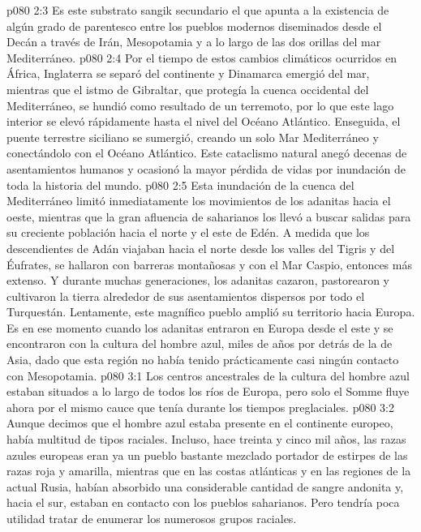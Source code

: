 \vs p080 2:3 Es este substrato sangik secundario el que apunta a la existencia de algún grado de parentesco entre los pueblos modernos diseminados desde el Decán a través de Irán, Mesopotamia y a lo largo de las dos orillas del mar Mediterráneo.
\vs p080 2:4 \pc Por el tiempo de estos cambios climáticos ocurridos en África, Inglaterra se separó del continente y Dinamarca emergió del mar, mientras que el istmo de Gibraltar, que protegía la cuenca occidental del Mediterráneo, se hundió como resultado de un terremoto, por lo que este lago interior se elevó rápidamente hasta el nivel del Océano Atlántico. Enseguida, el puente terrestre siciliano se sumergió, creando un solo Mar Mediterráneo y conectándolo con el Océano Atlántico. Este cataclismo natural anegó decenas de asentamientos humanos y ocasionó la mayor pérdida de vidas por inundación de toda la historia del mundo.
\vs p080 2:5 Esta inundación de la cuenca del Mediterráneo limitó inmediatamente los movimientos de los adanitas hacia el oeste, mientras que la gran afluencia de saharianos los llevó a buscar salidas para su creciente población hacia el norte y el este de Edén. A medida que los descendientes de Adán viajaban hacia el norte desde los valles del Tigris y del Éufrates, se hallaron con barreras montañosas y con el Mar Caspio, entonces más extenso. Y durante muchas generaciones, los adanitas cazaron, pastorearon y cultivaron la tierra alrededor de sus asentamientos dispersos por todo el Turquestán. Lentamente, este magnífico pueblo amplió su territorio hacia Europa. Es en ese momento cuando los adanitas entraron en Europa desde el este y se encontraron con la cultura del hombre azul, miles de años por detrás de la de Asia, dado que esta región no había tenido prácticamente casi ningún contacto con Mesopotamia.
\vs p080 3:1 Los centros ancestrales de la cultura del hombre azul estaban situados a lo largo de todos los ríos de Europa, pero solo el Somme fluye ahora por el mismo cauce que tenía durante los tiempos preglaciales.
\vs p080 3:2 Aunque decimos que el hombre azul estaba presente en el continente europeo, había multitud de tipos raciales. Incluso, hace treinta y cinco mil años, las razas azules europeas eran ya un pueblo bastante mezclado portador de estirpes de las razas roja y amarilla, mientras que en las costas atlánticas y en las regiones de la actual Rusia, habían absorbido una considerable cantidad de sangre andonita y, hacia el sur, estaban en contacto con los pueblos saharianos. Pero tendría poca utilidad tratar de enumerar los numerosos grupos raciales.
